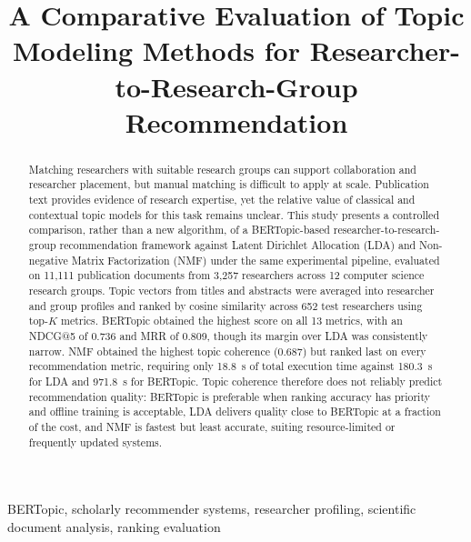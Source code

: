 \documentclass[conference]{IEEEtran}
\begin{document}
\title{A Comparative Evaluation of Topic Modeling Methods for Researcher-to-Research-Group Recommendation}


\maketitle

\begin{abstract}
Matching researchers with suitable research groups can support collaboration and researcher placement, but manual matching is difficult to apply at scale. Publication text provides evidence of research expertise, yet the relative value of classical and contextual topic models for this task remains unclear. This study presents a controlled comparison, rather than a new algorithm, of a BERTopic-based researcher-to-research-group recommendation framework against Latent Dirichlet Allocation (LDA) and Non-negative Matrix Factorization (NMF) under the same experimental pipeline, evaluated on 11,111 publication documents from 3,257 researchers across 12 computer science research groups. Topic vectors from titles and abstracts were averaged into researcher and group profiles and ranked by cosine similarity across 652 test researchers using top-$K$ metrics. BERTopic obtained the highest score on all 13 metrics, with an NDCG@5 of 0.736 and MRR of 0.809, though its margin over LDA was consistently narrow. NMF obtained the highest topic coherence (0.687) but ranked last on every recommendation metric, requiring only 18.8~s of total execution time against 180.3~s for LDA and 971.8~s for BERTopic. Topic coherence therefore does not reliably predict recommendation quality: BERTopic is preferable when ranking accuracy has priority and offline training is acceptable, LDA delivers quality close to BERTopic at a fraction of the cost, and NMF is fastest but least accurate, suiting resource-limited or frequently updated systems.
\end{abstract}
\vspace{0.25cm}

\begin{IEEEkeywords}
BERTopic, scholarly recommender systems, researcher profiling, scientific document analysis, ranking evaluation
\end{IEEEkeywords}
\end{document}

